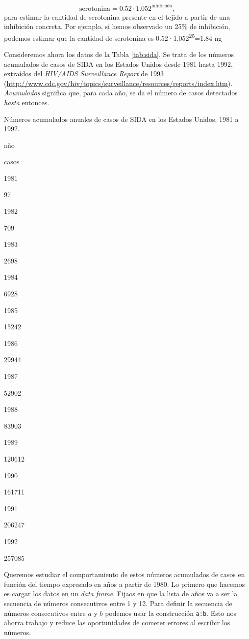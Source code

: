 \documentclass[]{book}
\theoremstyle{definition}
\theoremstyle{definition}
\theoremstyle{definition}
\theoremstyle{remark}
\let\BeginKnitrBlock\begin \let\EndKnitrBlock\end
\begin{document}
\[
\textrm{serotonina}= 0.52\cdot 1.052^{\textrm{inhibición}},
\]
para estimar la cantidad de serotonina presente en el tejido a partir de una inhibición concreta. Por ejemplo, si hemos observado un 25\% de inhibición, podemos estimar que la cantidad de serotonina es
0.52·1.052\textsuperscript{25}=1.84 ng

\BeginKnitrBlock{example}
\protect\hypertarget{exm:reg4}{}{\label{exm:reg4} }Consideremos ahora los datos de la Tabla \ref{tab:sida}. Se trata de los números acumulados de casos de SIDA en los Estados Unidos desde 1981 hasta 1992, extraídos del \emph{HIV/AIDS Surveillance Report} de 1993 (\url{http://www.cdc.gov/hiv/topics/surveillance/resources/reports/index.htm}). \emph{Acumulados} significa que, para cada año, se da el número de casos detectados \emph{hasta} entonces.
\EndKnitrBlock{example}

\label{tab:sida}Números acumulados anuales de casos de SIDA en los Estados Unidos, 1981 a 1992.

año

casos

1981

97

1982

709

1983

2698

1984

6928

1985

15242

1986

29944

1987

52902

1988

83903

1989

120612

1990

161711

1991

206247

1992

257085

Queremos estudiar el comportamiento de estos números acumulados de casos en función del tiempo expresado en años a partir de 1980. Lo primero que hacemos es cargar los datos en un \emph{data frame}. Fijaos en que la lista de años va a ser la secuencia de números consecutivos entre 1 y 12. Para definir la secuencia de números consecutivos entre \(a\) y \(b\) podemos usar la construcción \texttt{a:b}. Esto nos ahorra trabajo y reduce las oportunidades de cometer errores al escribir los números.
\end{document}
